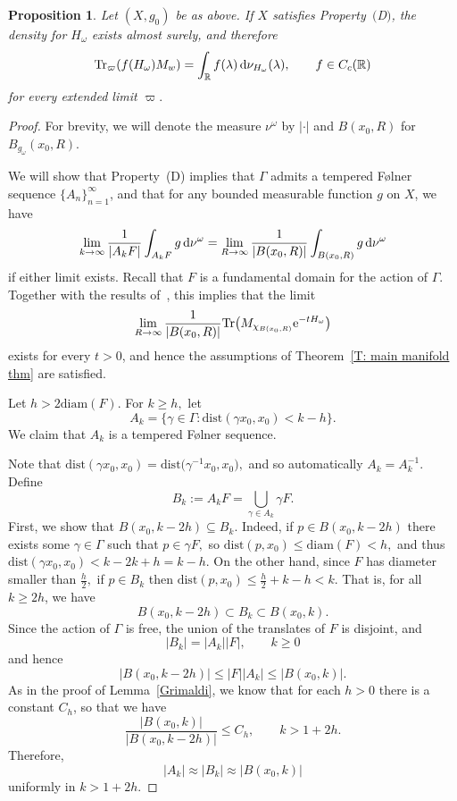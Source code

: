 \documentclass[pdftex]{sigma}
\numberwithin{equation}{section}
\newtheorem{Proposition}[Theorem]{Proposition}
 { \theoremstyle{definition}
\newtheorem{Definition}[Theorem]{Definition}
\newtheorem{Note}[Theorem]{Note}
\newtheorem{Example}[Theorem]{Example}
\newtheorem{Remark}[Theorem]{Remark} }
\begin{document}
\begin{Proposition}
 Let $(X, g_0)$ be as above. If $X$ satisfies Property~$($D$)$, the density for $H_\omega$ exists almost surely, and therefore
 \[
 \mathrm{Tr}_{\varpi}(f(H_\omega)M_w) = \int_{\mathbb{R}} f(\lambda)\, {\rm d}\nu_{H_\omega}(\lambda), \qquad f\in C_c(\mathbb{R})
 \]
 for every extended limit $\varpi.$
\end{Proposition}
\begin{proof}
 For brevity, we will denote the measure $\nu^{\omega}$ by $|\cdot|$
 and $B(x_0,R)$ for $B_{g_{\omega}}(x_0,R).$

 We will show that Property~(D) implies that $\Gamma$ admits a tempered F{\o}lner sequence $\{A_n\}_{n=1}^\infty$, and that for any bounded measurable function $g$ on $X$, we have
 \begin{equation}\label{equivalence_of_limits}
 \lim_{k\to\infty} \frac{1}{|A_kF|} \int_{A_kF}g\,{\rm d}\nu^{\omega} = \lim_{R\to\infty} \frac{1}{|B(x_0,R)|}\int_{B(x_0,R)} g\,{\rm d}\nu^{\omega}
 \end{equation}
 if either limit exists. Recall that $F$ is a fundamental domain for the action of $\Gamma.$
 Together with the results of~\cite{LenzPeyerimhoffVeselic2007}, this implies that the limit
 \[
 \lim_{R\to\infty} \frac{1}{|B(x_0,R)|}\mathrm{Tr}\big(M_{\chi_{B(x_0,R)}}{\rm e}^{-tH_{\omega}}\big)
 \]
 exists for every $t>0$, and hence the assumptions of Theorem~\ref{T: main manifold thm} are satisfied.

 Let $h>2\mathrm{diam}(F).$ For $k\geq h,$ let
 \[
 A_k = \{\gamma \in \Gamma\colon \mathrm{dist}(\gamma x_0,x_0) < k-h \}.
 \]
 We claim that $A_k$ is a tempered F{\o}lner sequence.


 Note that $\mathrm{dist}(\gamma x_0,x_0) = \mathrm{dist}\big(\gamma^{-1}x_0,x_0\big),$ and so automatically $A_k=A_k^{-1}.$
 Define
 \[
 B_k := A_kF = \bigcup_{\gamma\in A_k} \gamma F.
 \]
 First, we show that $B(x_0,k-2h)\subseteq B_k.$ Indeed, if $p \in B(x_0,k-2h)$ there exists some $\gamma\in \Gamma$ such that $p \in \gamma F,$ so $\mathrm{dist}(p,x_0) \leq \mathrm{diam}(F) < h,$ and thus $\mathrm{dist}(\gamma x_0,x_0) < k-2k+h =k-h.$ On the other hand, since $F$ has diameter smaller than $\frac{h}{2},$ if $p\in B_k$ then $\mathrm{dist}(p,x_0)\leq \frac{h}{2}+k-h < k.$
 That is, for all $k\geq 2h$, we have
 \[
 B(x_0,k-2h)\subset B_k \subset B(x_0,k).
 \]
 Since the action of $\Gamma$ is free, the union of the translates of $F$ is disjoint, and
 \[
 |B_k| = |A_k||F|,\qquad k\geq 0
 \]
 and hence
 \[
 |B(x_0,k-2h)| \leq |F||A_k| \leq |B(x_0,k)|.
 \]
 As in the proof of Lemma~\ref{Grimaldi}, we know that for each $h>0$ there is a constant $C_h$, so that we have
 \[
 \frac{|B(x_0, k)|}{|B(x_0, k-2h)|} \leq C_h, \qquad k > 1+2h.
 \]
 Therefore,
 \[
 |A_k| \approx |B_k| \approx |B(x_0,k)|
 \]
 uniformly in $k>1+2h.$


\end{proof}
\end{document}

